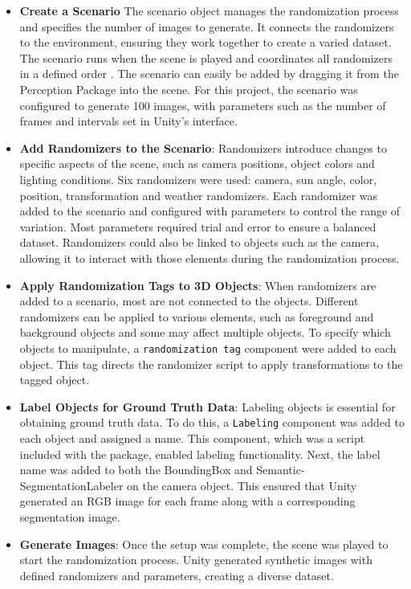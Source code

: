 \begin{itemize} \item \textbf{Create a Scenario}
The scenario object manages the randomization process and specifies the number of images to generate. It connects the randomizers to the environment, ensuring they work together to create a varied dataset. The scenario runs when the scene is played and coordinates all randomizers in a defined order \cite{borkman2021unityperceptiongeneratesynthetic}. The scenario can easily be added by dragging it from the Perception Package into the scene. For this project, the scenario was configured to generate 100 images, with parameters such as the number of frames and intervals set in Unity’s interface.

\item \textbf{Add Randomizers to the Scenario}: Randomizers introduce changes to specific aspects of the scene, such as camera positions, object colors and lighting conditions. Six randomizers were used: camera, sun angle, color, position, transformation and weather randomizers. Each randomizer was added to the scenario and configured with parameters to control the range of variation. Most parameters required trial and error to ensure a balanced dataset. Randomizers could also be linked to objects such as the camera, allowing it to interact with those elements during the randomization process.

\item \textbf{Apply Randomization Tags to 3D Objects}: When randomizers are added to a scenario, most are not connected to the objects. Different randomizers can be applied to various elements, such as foreground and background objects and some may affect multiple objects. To specify which objects to manipulate, a \texttt{randomization tag} component were added to each object. This tag directs the randomizer script to apply transformations to the tagged object.

\item \textbf{Label Objects for Ground Truth Data}: Labeling objects is essential for obtaining ground truth data. To do this, a \texttt{Labeling} component was added to each object and assigned a name. This component, which was a script included with the package, enabled labeling functionality. Next, the label name was added to both the BoundingBox and Semantic-SegmentationLabeler on the camera object. This ensured that Unity generated an RGB image for each frame along with a corresponding segmentation image.

\item \textbf{Generate Images}: Once the setup was complete, the scene was played to start the randomization process. Unity generated synthetic images with defined randomizers and parameters, creating a diverse dataset.
\end{itemize}


